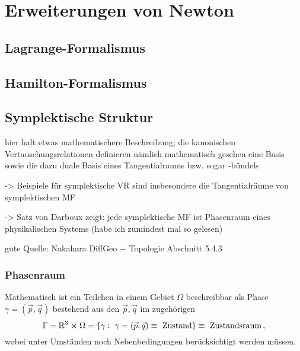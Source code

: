 \documentclass[../KlassMech_main.tex]{subfiles}
\begin{document}
\setcounter{chapter}{1}

\chapter{Erweiterungen von Newton}

	\section{Lagrange-Formalismus}

	\section{Hamilton-Formalismus}





	\section{Symplektische Struktur}

hier halt etwas mathematischere Beschreibung; die kanonischen Vertauschungsrelationen definieren nämlich mathematisch gesehen eine Basis sowie die dazu duale Basis eines Tangentialraums bzw. sogar -bündels

-> Beispiele für symplektische VR sind insbesondere die Tangentialräume von symplektischen MF

-> Satz von Darboux zeigt: jede symplektische MF ist Phasenraum eines physikalischen Systems (habe ich zumindest mal so gelesen)


gute Quelle: Nakahara DiffGeo + Topologie Abschnitt 5.4.3

	\subsection{Phasenraum}
Mathematisch ist ein Teilchen in einem Gebiet $\Omega$ beschreibbar als Phase $\gamma = (\vec{p}, \vec{q})$ bestehend aus den  $\vec{p}, \vec{q}$ im zugehörigen 
\begin{equation}
\Gamma = \mathbb{R}^3 \cross \Omega = \qty{\gamma: \; \gamma = (\vec{p}, \vec{q}) \equiv \text{ Zustand}} \equiv \text{ Zustandsraum} \, ,
\end{equation}
wobei unter Umständen noch Nebenbedingungen berücksichtigt werden müssen.
\end{document}
